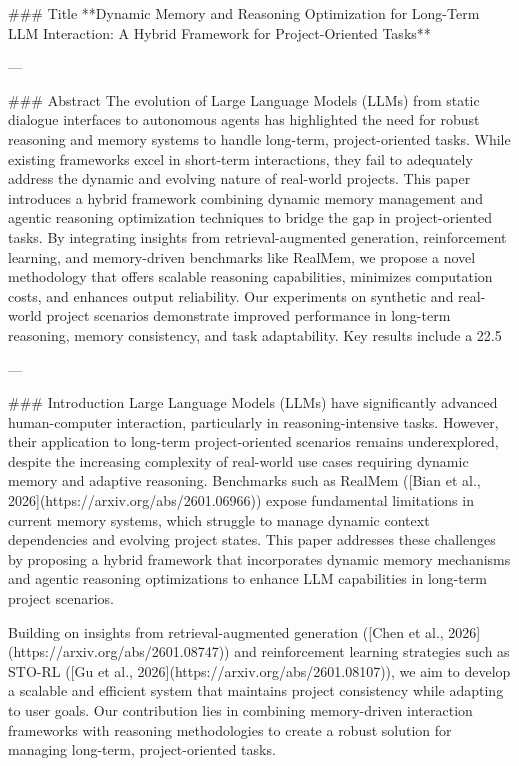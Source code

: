 ### Title  
**Dynamic Memory and Reasoning Optimization for Long-Term LLM Interaction: A Hybrid Framework for Project-Oriented Tasks**

---

### Abstract  
The evolution of Large Language Models (LLMs) from static dialogue interfaces to autonomous agents has highlighted the need for robust reasoning and memory systems to handle long-term, project-oriented tasks. While existing frameworks excel in short-term interactions, they fail to adequately address the dynamic and evolving nature of real-world projects. This paper introduces a hybrid framework combining dynamic memory management and agentic reasoning optimization techniques to bridge the gap in project-oriented tasks. By integrating insights from retrieval-augmented generation, reinforcement learning, and memory-driven benchmarks like RealMem, we propose a novel methodology that offers scalable reasoning capabilities, minimizes computation costs, and enhances output reliability. Our experiments on synthetic and real-world project scenarios demonstrate improved performance in long-term reasoning, memory consistency, and task adaptability. Key results include a 22.5%

---

### Introduction  
Large Language Models (LLMs) have significantly advanced human-computer interaction, particularly in reasoning-intensive tasks. However, their application to long-term project-oriented scenarios remains underexplored, despite the increasing complexity of real-world use cases requiring dynamic memory and adaptive reasoning. Benchmarks such as RealMem ([Bian et al., 2026](https://arxiv.org/abs/2601.06966)) expose fundamental limitations in current memory systems, which struggle to manage dynamic context dependencies and evolving project states. This paper addresses these challenges by proposing a hybrid framework that incorporates dynamic memory mechanisms and agentic reasoning optimizations to enhance LLM capabilities in long-term project scenarios.  

Building on insights from retrieval-augmented generation ([Chen et al., 2026](https://arxiv.org/abs/2601.08747)) and reinforcement learning strategies such as STO-RL ([Gu et al., 2026](https://arxiv.org/abs/2601.08107)), we aim to develop a scalable and efficient system that maintains project consistency while adapting to user goals. Our contribution lies in combining memory-driven interaction frameworks with reasoning methodologies to create a robust solution for managing long-term, project-oriented tasks.


